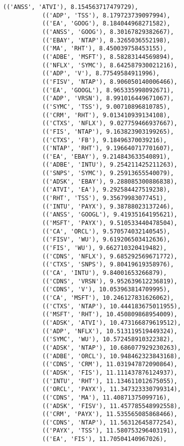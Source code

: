 \documentclass[11pt]{article}
\begin{document}
\begin{Verbatim}[commandchars=\\\{\}]
           (('ANSS', 'ATVI'), 8.154563717479729),
           (('ADP', 'TSS'), 8.179723739097994),
           (('EA', 'GOOG'), 8.184044968271582),
           (('ANSS', 'GOOG'), 8.30167829382667),
           (('EBAY', 'NTAP'), 8.3265036552198),
           (('MA', 'RHT'), 8.450039758453155),
           (('ADBE', 'MSFT'), 8.58283144569894),
           (('NFLX', 'SYMC'), 8.642587930021216),
           (('ADP', 'V'), 8.77549584911996),
           (('FISV', 'NTAP'), 8.906050140006466),
           (('EA', 'GOOGL'), 8.965335998092671),
           (('ADP', 'VRSN'), 8.991016449671067),
           (('SYMC', 'TSS'), 9.00710896810785),
           (('CRM', 'RHT'), 9.013410939134108),
           (('CTXS', 'NFLX'), 9.027759466937667),
           (('FIS', 'NTAP'), 9.163823903199265),
           (('CTXS', 'FB'), 9.18496370039216),
           (('NTAP', 'RHT'), 9.196640717701607),
           (('EA', 'EBAY'), 9.214843633540891),
           (('ADBE', 'INTU'), 9.254211425211263),
           (('SNPS', 'SYMC'), 9.25913655540079),
           (('ADSK', 'EBAY'), 9.288085300886838),
           (('ATVI', 'EA'), 9.292584427519238),
           (('RHT', 'TSS'), 9.35679983077451),
           (('INTU', 'PAYX'), 9.38788023137246),
           (('ANSS', 'GOOGL'), 9.41935164195621),
           (('MSFT', 'PAYX'), 9.510533440478504),
           (('CA', 'ORCL'), 9.570574032140545),
           (('FISV', 'WU'), 9.619206503412636),
           (('FIS', 'WU'), 9.662710320419482),
           (('CDNS', 'NFLX'), 9.685292569671772),
           (('CTXS', 'SNPS'), 9.80419619358976),
           (('CA', 'INTU'), 9.84001653266879),
           (('CDNS', 'VRSN'), 9.952639612236819),
           (('CDNS', 'V'), 10.053963814709995),
           (('CA', 'MSFT'), 10.246127831626062),
           (('CTXS', 'NTAP'), 10.444183675011955),
           (('MSFT', 'RHT'), 10.450809868954009),
           (('ADSK', 'ATVI'), 10.473166879619512),
           (('ADP', 'NFLX'), 10.513119519449324),
           (('SYMC', 'WU'), 10.572458910322382),
           (('ADSK', 'NTAP'), 10.686077929230263),
           (('ADBE', 'ORCL'), 10.948462323843168),
           (('CDNS', 'CRM'), 11.031947872090864),
           (('ADSK', 'FIS'), 11.111437876124937),
           (('INTU', 'RHT'), 11.134611012675055),
           (('ORCL', 'PAYX'), 11.347323330799314),
           (('CDNS', 'MA'), 11.40871375099716),
           (('ADSK', 'FISV'), 11.457785548992558),
           (('CRM', 'PAYX'), 11.535565085868466),
           (('CDNS', 'NTAP'), 11.56312645877254),
           (('PAYX', 'TSS'), 11.580753296403191),
           (('EA', 'FIS'), 11.70504140967026),

\end{Verbatim}
\end{document}
